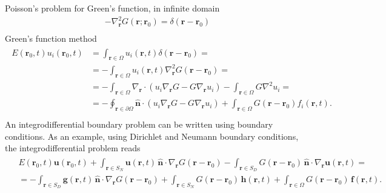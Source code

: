 \documentclass[letterpaper,10pt,italian]{jupyterBook}
\begin{document}
\sphinxAtStartPar
Poisson’s problem for Green’s function, in infinite domain
\begin{equation*}
\begin{split}
  - \nabla_{\mathbf{r}}^2 G(\mathbf{r}; \mathbf{r}_0) = \delta(\mathbf{r} - \mathbf{r}_0) \\
\end{split}
\end{equation*}
\sphinxAtStartPar
Green’s function method
\begin{equation*}
\begin{split}\begin{aligned}
  E(\mathbf{r}_0, t) u_i(\mathbf{r}_0, t) 
  & =   \int_{\mathbf{r} \in \Omega} u_i(\mathbf{r},t) \delta(\mathbf{r}-\mathbf{r}_0) = \\
  & = - \int_{\mathbf{r} \in \Omega} u_i(\mathbf{r},t) \nabla_{\mathbf{r}}^2 G(\mathbf{r}-\mathbf{r}_0) = \\
  & = - \int_{\mathbf{r} \in \Omega} \nabla_{\mathbf{r}} \cdot ( u_i \nabla_{\mathbf{r}} G - G \nabla_{\mathbf{r}} u_i) - \int_{\mathbf{r} \in \Omega} G \nabla^2 u_i= \\
  & = - \oint_{\mathbf{r} \in \partial \Omega} \hat{\mathbf{n}} \cdot ( u_i \nabla_{\mathbf{r}} G - G \nabla_{\mathbf{r}} u_i) + \int_{\mathbf{r} \in \Omega} G(\mathbf{r}-\mathbf{r}_0) f_i(\mathbf{r}, t) . \\
\end{aligned}\end{split}
\end{equation*}
\sphinxAtStartPar
An integro\sphinxhyphen{}differential boundary problem can be written using boundary conditions. As an example, using Dirichlet and Neumann boundary conditions, the integro\sphinxhyphen{}differential problem reads
\begin{equation*}
\begin{split}\begin{aligned}
&  E(\mathbf{r}_0, t) \mathbf{u}(\mathbf{r}_0, t) 
+ \int_{\mathbf{r} \in S_N} \mathbf{u}(\mathbf{r},t) \, \hat{\mathbf{n}} \cdot \nabla_{\mathbf{r}} G(\mathbf{r}-\mathbf{r}_0)
- \int_{\mathbf{r} \in S_D} G(\mathbf{r}-\mathbf{r}_0) \, \hat{\mathbf{n}} \cdot \nabla_{\mathbf{r}} \mathbf{u}(\mathbf{r},t) = \\ 
& =
- \int_{\mathbf{r} \in S_D} \mathbf{g}(\mathbf{r},t) \, \hat{\mathbf{n}} \cdot \nabla_{\mathbf{r}} G(\mathbf{r}-\mathbf{r}_0)
+ \int_{\mathbf{r} \in S_N} G(\mathbf{r}-\mathbf{r}_0) \, \mathbf{h}(\mathbf{r},t)  
+ \int_{\mathbf{r} \in \Omega} G(\mathbf{r}-\mathbf{r}_0) \, \mathbf{f}(\mathbf{r}, t) . \\
\end{aligned}\end{split}
\end{equation*}
\end{document}
